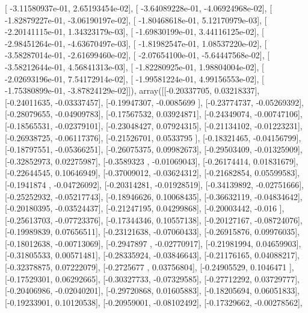 \documentclass{article}
\begin{document}
       [ -3.11580937e-01,   2.65193454e-02],
       [ -3.64089228e-01,  -4.06924968e-02],
       [ -1.82879227e-01,  -3.06190197e-02],
       [ -1.80468618e-01,   5.12170979e-03],
       [ -2.20141115e-01,   1.34323179e-03],
       [ -1.69830199e-01,   3.44116125e-02],
       [ -2.98451264e-01,  -4.63670497e-03],
       [ -1.81982547e-01,   1.08537220e-02],
       [ -3.58287014e-01,  -2.61699460e-02],
       [ -2.07654100e-01,  -5.64447568e-02],
       [ -3.58212644e-01,   4.56841313e-03],
       [ -1.82280925e-01,   1.98804004e-02],
       [ -2.02693196e-01,   7.54172914e-02],
       [ -1.99581224e-01,   4.99156553e-02],
       [ -1.75380899e-01,  -3.87824129e-02]]), array([[-0.20337705,  0.03218337],
       [-0.24011635, -0.03337457],
       [-0.19947307, -0.0085699 ],
       [-0.23774737, -0.05269392],
       [-0.28079655, -0.04909783],
       [-0.17567532,  0.03924871],
       [-0.24349074, -0.00747106],
       [-0.18565531, -0.02379101],
       [-0.23048427,  0.07924315],
       [-0.21134102, -0.01223231],
       [-0.26938725, -0.06117376],
       [-0.21526701,  0.0533795 ],
       [-0.18321465, -0.04156799],
       [-0.18797551, -0.05366251],
       [-0.26075375,  0.09982673],
       [-0.29503409, -0.01325909],
       [-0.32852973,  0.02275987],
       [-0.3589323 , -0.01069043],
       [-0.26174414,  0.01831679],
       [-0.22644545,  0.10646949],
       [-0.37009012, -0.03624312],
       [-0.21682854,  0.05599583],
       [-0.1941874 , -0.04726092],
       [-0.20314281, -0.01928519],
       [-0.34139892, -0.02751666],
       [-0.25252932, -0.05217743],
       [-0.18946626,  0.10068435],
       [-0.36632119, -0.04834642],
       [-0.20180395, -0.03524437],
       [-0.21247195,  0.04299868],
       [-0.20003442, -0.016     ],
       [-0.25613703, -0.07723376],
       [-0.17344346,  0.10557138],
       [-0.20127167, -0.08724076],
       [-0.19989839,  0.07656511],
       [-0.23121638, -0.07060433],
       [-0.26915876,  0.09976035],
       [-0.18012638, -0.00713069],
       [-0.2947897 , -0.02770917],
       [-0.21981994,  0.04659903],
       [-0.31805533,  0.00571481],
       [-0.28335924, -0.03846643],
       [-0.21176165,  0.04088217],
       [-0.32378875,  0.07222079],
       [-0.2725677 ,  0.03756804],
       [-0.24905529,  0.1046471 ],
       [-0.17529301,  0.06292665],
       [-0.30327733, -0.07329585],
       [-0.27712292,  0.03729777],
       [-0.20406986, -0.02040201],
       [-0.29720868,  0.01605883],
       [-0.18205694,  0.06051833],
       [-0.19233901,  0.10120538],
       [-0.20959001, -0.08102492],
       [-0.17329662, -0.00278562],
\end{document}
